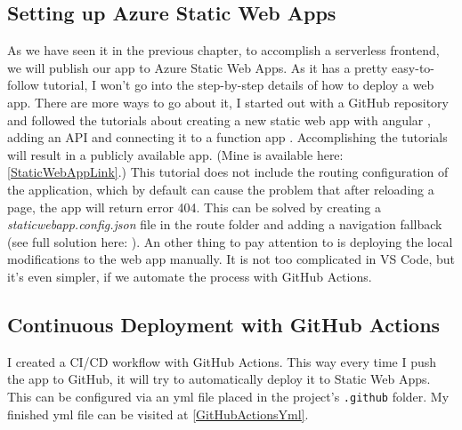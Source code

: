 \subsection{Setting up Azure Static Web Apps}
As we have seen it in the previous chapter, to accomplish a serverless frontend, we will publish our app to Azure Static Web Apps. As it has a pretty easy-to-follow tutorial, I won't go into the step-by-step details of how to deploy a web app. There are more ways to go about it, I started out with a GitHub repository and followed the tutorials about creating a new static web app with angular \cite{SWADeploy}, adding an API \cite{SWAAddAPI} and connecting it to a function app \cite{SWAAddFuncApp}. Accomplishing the tutorials will result in a publicly available app. (Mine is available here: \ref{StaticWebAppLink}.) This tutorial does not include the routing configuration of the application, which by default can cause the problem that after reloading a page, the app will return error 404. This can be solved by creating a \emph{staticwebapp.config.json} file in the route folder and adding a navigation fallback (see full solution here: \cite{SWAConfig}). An other thing to pay attention to is deploying the local modifications to the web app manually. It is not too complicated in VS Code, but it's even simpler, if we automate the process with GitHub Actions.
\subsection{Continuous Deployment with GitHub Actions}
I created a CI/CD workflow with GitHub Actions. \cite{CI/CDGitHubActions} This way every time I push the app to GitHub, it will try to automatically deploy it to Static Web Apps. This can be configured via an yml file placed in the project's \verb+.github+ folder. My finished yml file can be visited at \ref{GitHubActionsYml}.